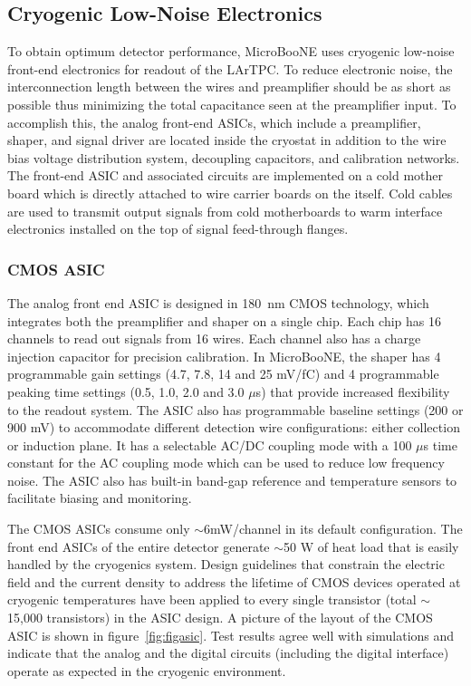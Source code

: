 \subsection{Cryogenic Low-Noise Electronics}
\label{sec:coldelectronics}
To obtain optimum detector performance, MicroBooNE uses cryogenic low-noise front-end electronics for readout of the LArTPC. To reduce electronic noise, the interconnection length between the \lartpc wires and preamplifier should be as short as possible thus minimizing the total capacitance seen at the preamplifier input. To accomplish this, the analog front-end ASICs, which include a preamplifier, shaper, and signal driver are located inside the cryostat in addition to the wire bias voltage distribution system, decoupling capacitors, and calibration networks. The front-end ASIC and associated circuits are implemented on a cold mother board which is directly attached to wire carrier boards on the \lartpc itself. Cold cables are used to transmit output signals from cold motherboards to warm interface electronics installed on the top of signal feed-through flanges.

\subsubsection{CMOS ASIC}

The analog front end ASIC is designed in 180~nm CMOS technology, which integrates both the preamplifier and shaper on a single chip. Each chip has 16 channels to read out signals from 16 wires. Each channel also has a charge injection capacitor for precision calibration. In MicroBooNE, the shaper has 4 programmable gain settings (4.7, 7.8, 14 and 25 mV/fC) and 4 programmable peaking time settings (0.5, 1.0, 2.0 and 3.0 $\mu$s) that provide increased flexibility to the readout system. The ASIC also has programmable baseline settings (200 or 900 mV) to accommodate different detection wire configurations: either collection or induction plane. It has a selectable AC/DC coupling mode with a 100 $\mu$s time constant for the AC coupling mode which can be used to reduce low frequency noise. The ASIC also has built-in band-gap reference and temperature sensors to facilitate biasing and monitoring.

The CMOS ASICs consume only $\sim$6mW/channel in its default configuration. The front end ASICs of the entire detector generate $\sim$50 W of heat load that is easily handled by the cryogenics system. Design guidelines that constrain the electric field and the current density to address the lifetime of CMOS devices operated at cryogenic temperatures have been applied to every single transistor (total $\sim$15,000 transistors) in the ASIC design. A picture of the layout of the CMOS ASIC is shown in figure~\ref{fig:figasic}. Test results agree well with simulations and indicate that the analog and the digital circuits (including the digital interface) operate as expected in the cryogenic environment. 

